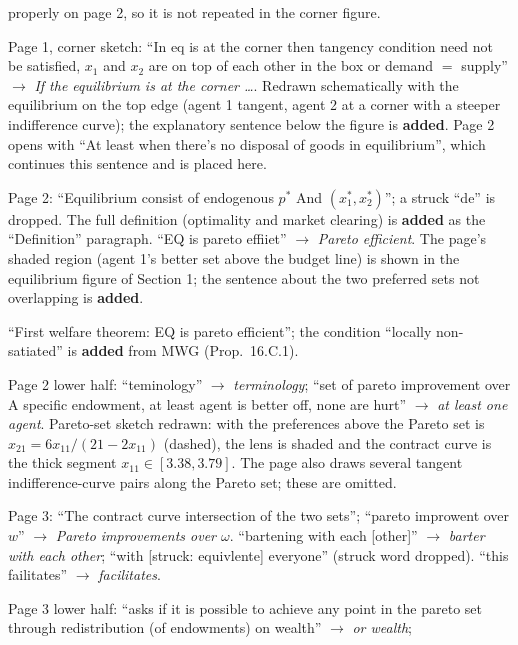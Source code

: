 \documentclass[11pt]{article}
\begin{document}
\begin{transcriptnotes}
        properly on page 2, so it is not repeated in the corner figure.
  \item Page 1, corner sketch: ``In eq is at the corner then tangency condition need not be
        satisfied, $x_1$ and $x_2$ are on top of each other in the box or demand $=$
        supply'' $\to$ \emph{If the equilibrium is at the corner \ldots}. Redrawn
        schematically with the equilibrium on the top edge (agent 1 tangent, agent 2 at a
        corner with a steeper indifference curve); the explanatory sentence below the
        figure is \textbf{added}. Page 2 opens with ``At least when there's no
        disposal of goods in equilibrium'', which continues this sentence and is placed
        here.
  \item Page 2: ``Equilibrium consist of endogenous $p^*$ And $(x_1^*,x_2^*)$''; a struck
        ``de'' is dropped. The full definition (optimality and market clearing) is
        \textbf{added} as the ``Definition'' paragraph. ``EQ is pareto effiiet'' $\to$
        \emph{Pareto efficient}. The page's shaded region (agent 1's better set above the
        budget line) is shown in the equilibrium figure of Section 1; the sentence about
        the two preferred sets not overlapping is \textbf{added}.
  \item ``First welfare theorem: EQ is pareto efficient''; the condition ``locally
        non-satiated'' is \textbf{added} from MWG (Prop.\ 16.C.1).
  \item Page 2 lower half: ``teminology'' $\to$ \emph{terminology}; ``set of pareto
        improvement over A specific endowment, at least agent is better off, none are
        hurt'' $\to$ \emph{at least one agent}. Pareto-set sketch redrawn: with the
        preferences above the Pareto set is $x_{21}=6x_{11}/(21-2x_{11})$ (dashed), the
        lens is shaded and the contract curve is the thick segment
        $x_{11}\in[3.38,3.79]$. The page also draws several tangent indifference-curve
        pairs along the Pareto set; these are omitted.
  \item Page 3: ``The contract curve intersection of the two sets'';
        ``pareto improwent over $w$'' $\to$ \emph{Pareto improvements over $\omega$}.
        ``bartening with each [other]'' $\to$ \emph{barter with each other}; ``with
        [struck: equivlente] everyone'' (struck word dropped). ``this failitates''
        $\to$ \emph{facilitates}.
  \item Page 3 lower half: ``asks if it is possible to achieve any point in the pareto set
        through redistribution (of endowments) on wealth'' $\to$ \emph{or wealth};

\end{transcriptnotes}
\end{document}
